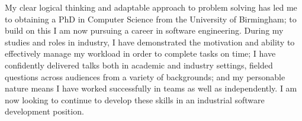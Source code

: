 
\vspace*{\fill}
\hspace{-2.5em}
\begin{minipage}{\sidewidth+0.5\margin}
  \begin{center}

    \vspace{1.5em}


    \vspace{1em}

    My clear logical thinking and adaptable approach to problem solving has
    led me to obtaining a PhD in Computer Science from the University of
    Birmingham; to build on this I am now pursuing a career in software
    engineering.
    During my studies and roles in industry, I have demonstrated the
    motivation and ability to effectively manage my workload in order
    to complete tasks on time; I have confidently delivered talks both in
    academic and industry settings, fielded questions across audiences from
    a variety of backgrounds; and my personable nature means I have worked
    successfully in teams as well as independently.
    I am now looking to continue to develop these skills in an industrial
    software development position.

    \vspace{1.5em}


    \vspace{1em}



\end{center}
\end{minipage}
